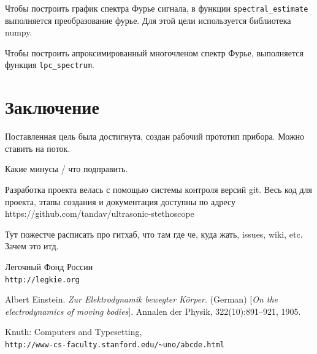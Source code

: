 Чтобы построить график спектра Фурье сигнала, в функции \verb|spectral_estimate| выполняется преобразование фурье. Для этой цели используется библиотека numpy.

Чтобы построить апроксимированный многочленом спектр Фурье, выполняется функция \verb|lpc_spectrum|.

\section{Заключение}
Поставленная цель была достигнута, создан рабочий прототип прибора. Можно ставить на поток. 

Какие минусы / что подправить. 

Разработка проекта велась с помощью системы контроля версий git. Весь код для проекта, этапы создания и документация доступны по адресу https://github.com/tandav/ultrasonic-stethoscope

Тут пожестче расписать про гитхаб, что там где че, куда жать, issues, wiki, etc. Зачем это итд. 

\newpage

\begin{thebibliography}{9}
Легочный Фонд России
\\\texttt{http://legkie.org}
 
Albert Einstein. 
\textit{Zur Elektrodynamik bewegter K{\"o}rper}. (German) 
[\textit{On the electrodynamics of moving bodies}]. 
Annalen der Physik, 322(10):891–921, 1905.
 
Knuth: Computers and Typesetting,
\\\texttt{http://www-cs-faculty.stanford.edu/\~{}uno/abcde.html}
\end{thebibliography}



